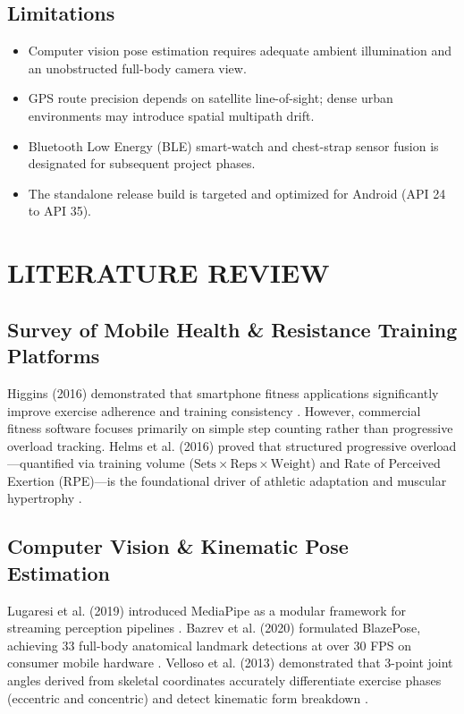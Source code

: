 \documentclass[12pt,a4paper]{report}
\begin{document}
\section{Limitations}
\begin{itemize}
    \item Computer vision pose estimation requires adequate ambient illumination and an unobstructed full-body camera view.
    \item GPS route precision depends on satellite line-of-sight; dense urban environments may introduce spatial multipath drift.
    \item Bluetooth Low Energy (BLE) smart-watch and chest-strap sensor fusion is designated for subsequent project phases.
    \item The standalone release build is targeted and optimized for Android (API 24 to API 35).
\end{itemize}

\chapter{LITERATURE REVIEW}

\section{Survey of Mobile Health \& Resistance Training Platforms}
Higgins (2016) demonstrated that smartphone fitness applications significantly improve exercise adherence and training consistency \cite{higgins}. However, commercial fitness software focuses primarily on simple step counting rather than progressive overload tracking. Helms et al. (2016) proved that structured progressive overload---quantified via training volume ($\text{Sets} \times \text{Reps} \times \text{Weight}$) and Rate of Perceived Exertion (RPE)---is the foundational driver of athletic adaptation and muscular hypertrophy \cite{helms}.

\section{Computer Vision \& Kinematic Pose Estimation}
Lugaresi et al. (2019) introduced MediaPipe as a modular framework for streaming perception pipelines \cite{mediapipe}. Bazrev et al. (2020) formulated BlazePose, achieving 33 full-body anatomical landmark detections at over 30 FPS on consumer mobile hardware \cite{blazepose}. Velloso et al. (2013) demonstrated that 3-point joint angles derived from skeletal coordinates accurately differentiate exercise phases (eccentric and concentric) and detect kinematic form breakdown \cite{velloso}.
\end{document}
